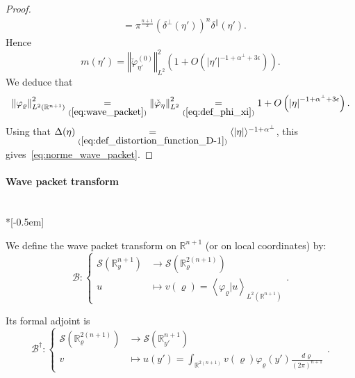 \documentclass[AHL,Unicode,longabstracts,published]{cedram}
\newcommand*\eq[1]{\underset{(#1)}{=}}
\newcommand{\clS}{\mathcal{S}}
\newcommand{\clB}{\mathcal{B}}
\newcommand{\bbR}{\mathbb{R}}
\newcommand{\bbR}{\mathbb{R}}
\begin{document}
\begin{proof}
\begin{align*}
&=\pi^{\frac{n+1}{2}}\left(\delta^{\perp}\left(\eta'\right)\right)^{n}\delta^{\parallel}\left(\eta'\right).
\end{align*}
Hence
\[
m\left(\eta'\right)=\left\Vert \check{\varphi}_{\eta'}^{\left(0\right)}\right\Vert _{L^{2}}^{2}\left(1+O\left(\left|\eta'\right|^{-1+\alpha^{\perp}+3\epsilon}\right)\right).
\]
We deduce that
\[
\left\Vert \varphi_{\varrho}\right\Vert _{L^{2}\left(\bbR^{n+1}\right)}^{2}\eq{\ref{eq:wave_packet}}\left\Vert \check{\varphi}_{\eta}\right\Vert _{L^{2}}^{2}\eq{\ref{eq:def_phi_xi}}1+O\left(\left|\eta\right|^{-1+\alpha^{\perp}+3\epsilon}\right).
\]
Using that $\Delta(\eta)\eq{\ref{eq:def_distortion_function_D-1}}
\langle|\eta|\rangle^{-1+\alpha^{\perp}}$, this gives~\eqref{eq:norme_wave_packet}.
\end{proof}

\paragraph{Wave packet transform}\ \\*[-0.5em]

\begin{cBoxA}{}
\begin{defi}
We define the wave packet transform on $\bbR^{n+1}$ (or on local coordinates) by:
\begin{equation}\label{eq:def_Bargamnn_B}
\clB:
\begin{cases}
\clS\left(\bbR_{y}^{n+1}\right) & \rightarrow\clS\left(\bbR_{\varrho}^{2\left(n+1\right)}\right)\\
u & \mapsto v\left(\varrho\right)=\left\langle \varphi_{\varrho}|u\right\rangle _{L^{2}\left(\bbR^{n+1}\right)}
\end{cases}.
\end{equation}
\end{defi}
\end{cBoxA}

Its formal adjoint is
\begin{equation}\label{eq:def_Bargamnn_*}
\clB^{\dagger}:
\begin{cases}
\clS\left(\bbR_{\varrho}^{2\left(n+1\right)}\right) & \rightarrow\clS\left(\bbR_{y'}^{n+1}\right)\\
v & \mapsto u\left(y'\right)=\int_{\bbR^{2\left(n+1\right)}}v\left(\varrho\right)\varphi_{\varrho}\left(y'\right)\frac{d\varrho}{\left(2\pi\right)^{n+1}}
\end{cases}.
\end{equation}
\end{document}
